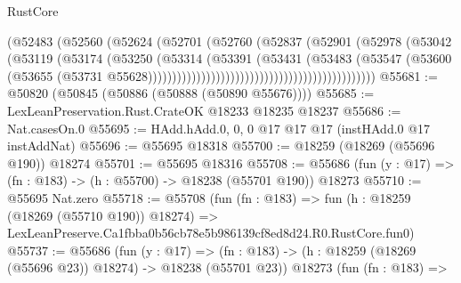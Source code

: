 \begin{lexlean}{RustCore}
\begin{coremodule}
                                                          (@52483
                                                            (@52560
                                                              (@52624
                                                                (@52701
                                                                  (@52760
                                                                    (@52837
                                                                      (@52901
                                                                        (@52978
                                                                          (@53042
                                                                            (@53119
                                                                              (@53174
                                                                                (@53250
                                                                                  (@53314
                                                                                    (@53391
                                                                                      (@53431
                                                                                        (@53483
                                                                                          (@53547
                                                                                            (@53600
                                                                                              (@53655
                                                                                                (@53731
                                                                                                  @55628)))))))))))))))))))))))))))))))))))))))))))))))
@55681 := @50820 (@50845 (@50886 (@50888 (@50890 @55676))))
@55685 := LexLeanPreservation.Rust.CrateOK @18233 @18235 @18237
@55686 := Nat.casesOn.{0}
@55695 := HAdd.hAdd.{0, 0, 0} @17 @17 @17 (instHAdd.{0} @17 instAddNat)
@55696 := @55695 @18318
@55700 := @18259 (@18269 (@55696 @190)) @18274
@55701 := @55695 @18316
@55708 := @55686 (fun (y : @17) => (fn : @183) -> (h : @55700) -> @18238 (@55701 @190)) @18273
@55710 := @55695 Nat.zero
@55718 := @55708
    (fun (fn : @183) =>
    fun (h : @18259 (@18269 (@55710 @190)) @18274) =>
    LexLeanPreserve.Ca1fbba0b56cb78e5b986139cf8ed8d24.R0.RustCore.fun0)
@55737 := @55686
    (fun (y : @17) =>
    (fn : @183) -> (h : @18259 (@18269 (@55696 @23)) @18274) -> @18238 (@55701 @23))
    @18273
    (fun (fn : @183) =>

\end{coremodule}
\end{lexlean}
